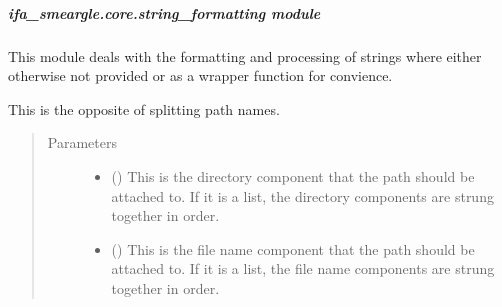 \documentclass[letterpaper,10pt,english]{sphinxmanual}
\begin{document}
\subparagraph{ifa\_smeargle.core.string\_formatting module}
\label{\detokenize{docstrings/ifa_smeargle.core.string_formatting:module-ifa_smeargle.core.string_formatting}}\label{\detokenize{docstrings/ifa_smeargle.core.string_formatting:ifa-smeargle-core-string-formatting-module}}\label{\detokenize{docstrings/ifa_smeargle.core.string_formatting::doc}}
This module deals with the formatting and processing of strings
where either otherwise not provided or as a wrapper function
for convience.

\begin{fulllineitems}
\label{\detokenize{docstrings/ifa_smeargle.core.string_formatting:ifa_smeargle.core.string_formatting.combine_pathname}}
This is the opposite of splitting path names.
\begin{quote}\begin{description}
\item[{Parameters}] \leavevmode\begin{itemize}
\item {} 
 (\sphinxstyleliteralemphasis{\sphinxupquote{ (}}\sphinxstyleliteralemphasis{\sphinxupquote{)}}) \textendash{} This is the directory component that the path should be
attached to. If it is a list, the directory components are
strung together in order.

\item {} 
 (\sphinxstyleliteralemphasis{\sphinxupquote{ (}}\sphinxstyleliteralemphasis{\sphinxupquote{)}}) \textendash{} This is the file name component that the path should be
attached to. If it is a list, the file name components are
strung together in order.


\end{itemize}
\end{description}
\end{quote}
\end{fulllineitems}
\end{document}
